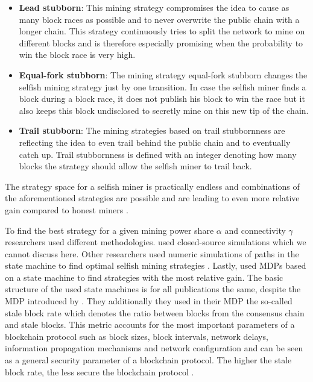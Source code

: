 \begin{itemize}
	\item \textbf{Lead stubborn}: 
	This mining strategy compromises the idea to cause as many block races as possible and to never overwrite the public chain with a longer chain.
	This strategy continuously tries to split the network to mine on different blocks and is therefore especially promising when the probability to win the block race is very high.
	\item \textbf{Equal-fork stubborn}: 
	The mining strategy equal-fork stubborn changes the selfish mining strategy just by one transition.
	In case the selfish miner finds a block during a block race, it does not publish his block to win the race but it also keeps this block undisclosed to secretly mine on this new tip of the chain.
\item \textbf{Trail stubborn}: 
The mining strategies based on trail stubbornness are reflecting the idea to even trail behind the public chain and to eventually catch up.
	Trail stubbornness is defined with an integer denoting how many blocks the strategy should allow the selfish miner to trail back.
\end{itemize}

The strategy space for a selfish miner is practically endless and combinations of the aforementioned strategies are possible and are leading to even more relative gain compared to honest miners \cite{nayak2016stubborn,sapirshtein2016optimal, gervais2015tampering, gervais2016security, bahack2013theoretical}.

To find the best strategy for a given mining power share $\alpha$ and connectivity $\gamma$ researchers used different methodologies.
\cite{eyal2014majority, sapirshtein2016optimal} used closed-source simulations which we cannot discuss here.
Other researchers used numeric simulations of paths in the state machine to find optimal selfish mining strategies \cite{gervais2015tampering, nayak2016stubborn}.
Lastly, \cite{sapirshtein2016optimal, gervais2016security} used MDPs based on a state machine to find strategies with the most relative gain.
The basic structure of the used state machines is for all publications the same, despite the MDP introduced by \cite{gervais2016security}.
They additionally they used in their MDP the so-called stale block rate which denotes the ratio between blocks from the consensus chain and stale blocks.
This metric accounts for the most important parameters of a blockchain protocol such as block sizes, block intervals, network delays, information propagation mechanisms and network configuration and can be seen as a general security parameter of a blockchain protocol.
The higher the stale block rate, the less secure the blockchain protocol \cite{gervais2016security}.

